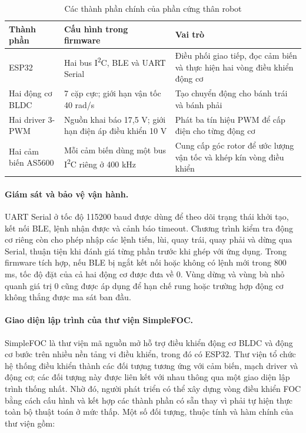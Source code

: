 \begin{table}[H]
\centering
\caption{Các thành phần chính của phần cứng thân robot}
\label{tab:robot_body_hardware}
\small
\begin{tabularx}{\textwidth}{|p{3.0cm}|p{4.0cm}|X|}
\hline
\textbf{Thành phần} & \textbf{Cấu hình trong firmware} & \textbf{Vai trò} \\
\hline
ESP32 & Hai bus I\textsuperscript{2}C, BLE và UART Serial & Điều phối giao tiếp, đọc cảm biến và thực hiện hai vòng điều khiển động cơ \\
\hline
Hai động cơ BLDC & 7 cặp cực; giới hạn vận tốc 40 rad/s & Tạo chuyển động cho bánh trái và bánh phải \\
\hline
Hai driver 3-PWM & Nguồn khai báo 17,5 V; giới hạn điện áp điều khiển 10 V & Phát ba tín hiệu PWM để cấp điện cho từng động cơ \\
\hline
Hai cảm biến AS5600 & Mỗi cảm biến dùng một bus I\textsuperscript{2}C riêng ở 400 kHz & Cung cấp góc rotor để ước lượng vận tốc và khép kín vòng điều khiển \\
\hline
\end{tabularx}
\end{table}

\paragraph{Giám sát và bảo vệ vận hành.}
UART Serial ở tốc độ 115200 baud được dùng để theo dõi trạng thái khởi tạo, kết nối BLE, lệnh nhận được và cảnh báo timeout. Chương trình kiểm tra động cơ riêng còn cho phép nhập các lệnh tiến, lùi, quay trái, quay phải và dừng qua Serial, thuận tiện khi đánh giá từng phần trước khi ghép với ứng dụng. Trong firmware tích hợp, nếu BLE bị ngắt kết nối hoặc không có lệnh mới trong 800 ms, tốc độ đặt của cả hai động cơ được đưa về 0. Vùng dừng và vùng bù nhỏ quanh giá trị 0 cũng được áp dụng để hạn chế rung hoặc trường hợp động cơ không thắng được ma sát ban đầu.

\paragraph{Giao diện lập trình của thư viện SimpleFOC.}
SimpleFOC là thư viện mã nguồn mở hỗ trợ điều khiển động cơ BLDC và động cơ bước trên nhiều nền tảng vi điều khiển, trong đó có ESP32. Thư viện tổ chức hệ thống điều khiển thành các đối tượng tương ứng với cảm biến, mạch driver và động cơ; các đối tượng này được liên kết với nhau thông qua một giao diện lập trình thống nhất. Nhờ đó, người phát triển có thể xây dựng vòng điều khiển FOC bằng cách cấu hình và kết hợp các thành phần có sẵn thay vì phải tự hiện thực toàn bộ thuật toán ở mức thấp. Một số đối tượng, thuộc tính và hàm chính của thư viện gồm:

